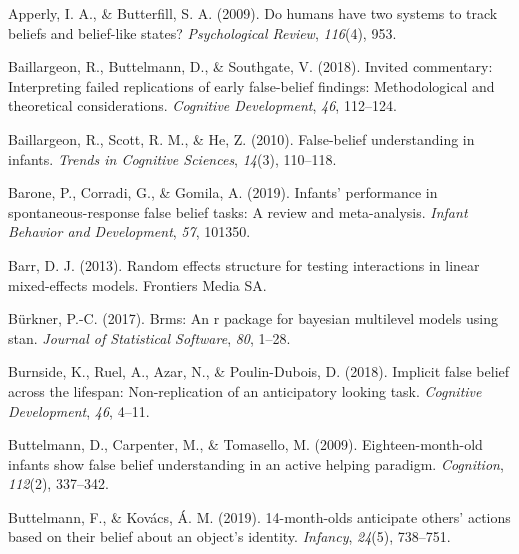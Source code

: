 \documentclass[
  english,
  man,floatsintext]{apa6}
\newlength{\cslhangindent}
\newlength{\cslentryspacingunit} %
\newenvironment{CSLReferences}[2] %
 {%
  \setlength{\parindent}{0pt}
  \ifodd #1
  \let\oldpar\par
  \def\par{\hangindent=\cslhangindent\oldpar}
  \fi
  \setlength{\parskip}{#2\cslentryspacingunit}
 }%
 {}
\begin{document}
\hypertarget{refs}{}
\begin{CSLReferences}{1}{0}
\leavevmode{}%
Apperly, I. A., \& Butterfill, S. A. (2009). Do humans have two systems to track beliefs and belief-like states? \emph{Psychological Review}, \emph{116}(4), 953.

\leavevmode{}%
Baillargeon, R., Buttelmann, D., \& Southgate, V. (2018). Invited commentary: Interpreting failed replications of early false-belief findings: Methodological and theoretical considerations. \emph{Cognitive Development}, \emph{46}, 112--124.

\leavevmode{}%
Baillargeon, R., Scott, R. M., \& He, Z. (2010). False-belief understanding in infants. \emph{Trends in Cognitive Sciences}, \emph{14}(3), 110--118.

\leavevmode{}%
Barone, P., Corradi, G., \& Gomila, A. (2019). Infants' performance in spontaneous-response false belief tasks: A review and meta-analysis. \emph{Infant Behavior and Development}, \emph{57}, 101350.

\leavevmode{}%
Barr, D. J. (2013). Random effects structure for testing interactions in linear mixed-effects models. Frontiers Media SA.

\leavevmode{}%
Bürkner, P.-C. (2017). Brms: An r package for bayesian multilevel models using stan. \emph{Journal of Statistical Software}, \emph{80}, 1--28.

\leavevmode{}%
Burnside, K., Ruel, A., Azar, N., \& Poulin-Dubois, D. (2018). Implicit false belief across the lifespan: Non-replication of an anticipatory looking task. \emph{Cognitive Development}, \emph{46}, 4--11.

\leavevmode{}%
Buttelmann, D., Carpenter, M., \& Tomasello, M. (2009). Eighteen-month-old infants show false belief understanding in an active helping paradigm. \emph{Cognition}, \emph{112}(2), 337--342.

\leavevmode{}%
Buttelmann, F., \& Kovács, Á. M. (2019). 14-month-olds anticipate others' actions based on their belief about an object's identity. \emph{Infancy}, \emph{24}(5), 738--751.


\end{CSLReferences}
\end{document}
